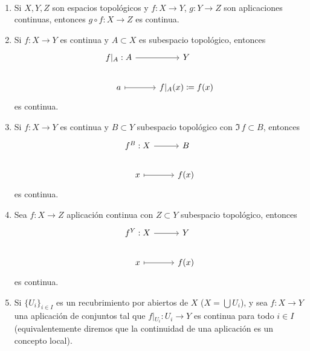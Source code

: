 \begin{propis} \, 
\begin{enumerate}
    \item Si $X, Y, Z$ son espacios topol\'ogicos y $f: X \longrightarrow Y$, $g:Y \longrightarrow Z$ son aplicaciones continuas, entonces $g \circ f : X \longrightarrow Z$ es continua.
    \item Si $f: X \longrightarrow Y$ es continua y $A \subset X$ es subespacio topol\'ogico, entonces 
    $$\bt f\vert{}_A : A \rar & Y  \\ a \rarmaps & f\vert{}_A(x) \coloneqq f(x) \et$$
    es continua.
    \item Si $f: X \longrightarrow Y$ es continua y $B\subset Y$ subespacio topol\'ogico con $\Im \, f\subset B$, entonces 
    $$\bt f^B: X \rar & B \\ x \rarmaps & f(x) \et$$
    es continua.
    \item Sea $f: X\longrightarrow Z$ aplicaci\'on continua con $Z \subset Y$ subespacio topol\'ogico, entonces 
    $$\bt f^Y: X \rar & Y \\ x \rarmaps & f(x) \et$$
    es continua.
    \item Si $\{U_i\}_{i \in I}$ es un recubrimiento por abiertos de $X$ ($X = \bigcup U_i$), y sea $f: X \longrightarrow Y$ una aplicaci\'on de conjuntos tal que $f\vert{}_{U_i} : U_i \longrightarrow Y$ es continua para todo $i\in I$ (equivalentemente diremos que la continuidad de una aplicaci\'on es un concepto local). 
\end{enumerate}
\end{propis}
